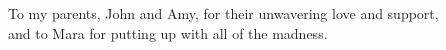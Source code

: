 \begin{dedication}
    To my parents, John and Amy, for their unwavering love and support, \\
    and to Mara for putting up with all of the madness.

\end{dedication}
